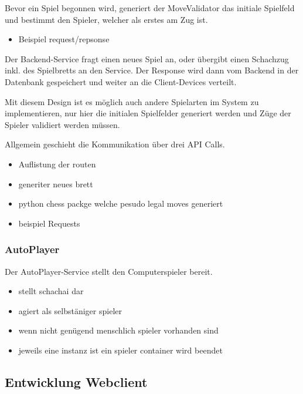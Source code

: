 Bevor ein Spiel begonnen wird, generiert der MoveValidator das initiale
Spielfeld und bestimmt den Spieler, welcher als erstes am Zug ist.

\begin{itemize}
\tightlist
\item
  Beispiel request/repsonse
\end{itemize}

Der Backend-Service fragt einen neues Spiel an, oder übergibt einen
Schachzug inkl. des Spielbretts an den Service. Der Response wird dann
vom Backend in der Datenbank gespeichert und weiter an die
Client-Devices verteilt.

Mit diesem Design ist es möglich auch andere Spielarten im System zu
implementieren, nur hier die initialen Spielfelder generiert werden und
Züge der Spieler validiert werden müssen.

Allgemein geschieht die Kommunikation über drei API Calls.

\begin{itemize}
\item
  Auflistung der routen
\item
  generiter neues brett
\item
  python chess packge welche pesudo legal moves generiert
\item
  beispiel Requests
\end{itemize}

\hypertarget{autoplayer}{%
\subsubsection{AutoPlayer}\label{autoplayer}}

Der AutoPlayer-Service stellt den Computerspieler bereit.

\begin{itemize}
\tightlist
\item
  stellt schachai dar
\item
  agiert als selbstäniger spieler
\item
  wenn nicht genügend menschlich spieler vorhanden sind
\item
  jeweils eine instanz ist ein spieler container wird beendet
\end{itemize}

\hypertarget{entwicklung-webclient}{%
\subsection{Entwicklung Webclient}\label{entwicklung-webclient}}

